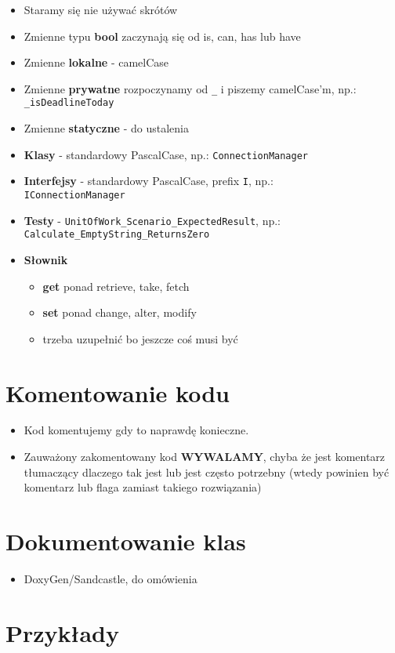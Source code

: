 \documentclass[a4paper]{article}
\begin{document}
	\begin{itemize}
		\item Staramy się nie używać skrótów
		\item Zmienne typu \textbf{bool} zaczynają się od is, can, has lub have
		\item Zmienne \textbf{lokalne} - camelCase
		\item Zmienne \textbf{prywatne} rozpoczynamy od \texttt{\_} i piszemy camelCase'm, np.:\\\texttt{\_isDeadlineToday}
		\item Zmienne \textbf{statyczne} - do ustalenia
		\item \textbf{Klasy} - standardowy PascalCase, np.: \texttt{ConnectionManager}
		\item \textbf{Interfejsy} - standardowy PascalCase, prefix \texttt{I}, np.: \\ \texttt{IConnectionManager}
		\item \textbf{Testy} - \texttt{UnitOfWork\_Scenario\_ExpectedResult}, np.: \\
		\texttt{Calculate\_EmptyString\_ReturnsZero}
		\item \textbf{Słownik}
		\begin{itemize}
			\item \textbf{get} ponad retrieve, take, fetch
			\item \textbf{set} ponad change, alter, modify
			\item trzeba uzupełnić bo jeszcze coś musi być
		\end{itemize}
	\end{itemize}	
	
	\section{Komentowanie kodu}
	\begin{itemize}
		\item Kod komentujemy gdy to naprawdę konieczne.
		\item Zauważony zakomentowany kod \textbf{WYWALAMY}, chyba że jest komentarz tłumaczący dlaczego tak jest lub jest często potrzebny (wtedy powinien być komentarz lub flaga zamiast takiego rozwiązania)
	\end{itemize}
	
	\section{Dokumentowanie klas}
	\begin{itemize}
		\item DoxyGen/Sandcastle, do omówienia
	\end{itemize}
	
	\section{Przykłady}
	
	
\end{document}
